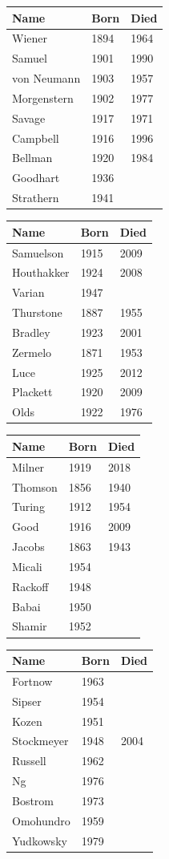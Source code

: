 \noindent
\begin{tabularx}{\textwidth}{Xll}
\toprule
Name & Born & Died \\
\midrule
Wiener & 1894 & 1964 \\
Samuel & 1901 & 1990 \\
von Neumann & 1903 & 1957 \\
Morgenstern & 1902 & 1977 \\
Savage & 1917 & 1971 \\
Campbell & 1916 & 1996 \\
Bellman & 1920 & 1984 \\
Goodhart & 1936 &  \\
Strathern & 1941 &  \\
\bottomrule
\end{tabularx}
\par\medskip
\noindent
\begin{tabularx}{\textwidth}{Xll}
\toprule
Name & Born & Died \\
\midrule
Samuelson & 1915 & 2009 \\
Houthakker & 1924 & 2008 \\
Varian & 1947 &  \\
Thurstone & 1887 & 1955 \\
Bradley & 1923 & 2001 \\
Zermelo & 1871 & 1953 \\
Luce & 1925 & 2012 \\
Plackett & 1920 & 2009 \\
Olds & 1922 & 1976 \\
\bottomrule
\end{tabularx}
\par\medskip
\noindent
\begin{tabularx}{\textwidth}{Xll}
\toprule
Name & Born & Died \\
\midrule
Milner & 1919 & 2018 \\
Thomson & 1856 & 1940 \\
Turing & 1912 & 1954 \\
Good & 1916 & 2009 \\
Jacobs & 1863 & 1943 \\
Micali & 1954 &  \\
Rackoff & 1948 &  \\
Babai & 1950 &  \\
Shamir & 1952 &  \\
\bottomrule
\end{tabularx}
\par\medskip
\noindent
\begin{tabularx}{\textwidth}{Xll}
\toprule
Name & Born & Died \\
\midrule
Fortnow & 1963 &  \\
Sipser & 1954 &  \\
Kozen & 1951 &  \\
Stockmeyer & 1948 & 2004 \\
Russell & 1962 &  \\
Ng & 1976 &  \\
Bostrom & 1973 &  \\
Omohundro & 1959 &  \\
Yudkowsky & 1979 &  \\
\bottomrule
\end{tabularx}

